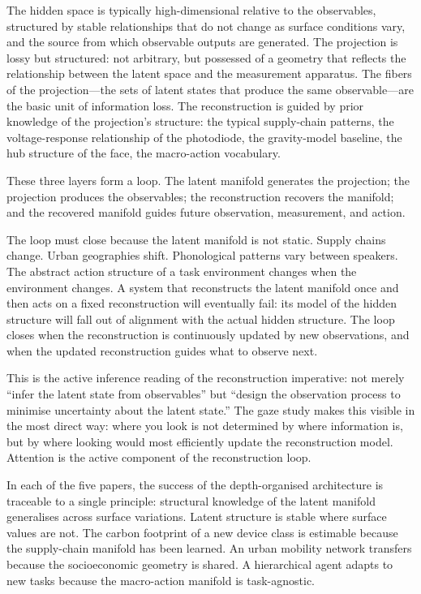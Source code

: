 \documentclass[12pt, letterpaper]{article}
\theoremstyle{remark}
\begin{document}
The hidden space is typically high-dimensional relative to the observables,
structured by stable relationships that do not change as surface conditions
vary, and the source from which observable outputs are generated.  The
projection is lossy but structured: not arbitrary, but possessed of a
geometry that reflects the relationship between the latent space and the
measurement apparatus.  The fibers of the projection---the sets of latent
states that produce the same observable---are the basic unit of information
loss.  The reconstruction is guided by prior knowledge of the projection's
structure: the typical supply-chain patterns, the voltage-response
relationship of the photodiode, the gravity-model baseline, the hub
structure of the face, the macro-action vocabulary.

These three layers form a loop.  The latent manifold generates the
projection; the projection produces the observables; the reconstruction
recovers the manifold; and the recovered manifold guides future observation,
measurement, and action.

The loop must close because the latent manifold is not static.  Supply
chains change.  Urban geographies shift.  Phonological patterns vary
between speakers.  The abstract action structure of a task environment
changes when the environment changes.  A system that reconstructs the
latent manifold once and then acts on a fixed reconstruction will eventually
fail: its model of the hidden structure will fall out of alignment with the
actual hidden structure.  The loop closes when the reconstruction is
continuously updated by new observations, and when the updated
reconstruction guides what to observe next.

This is the active inference reading of the reconstruction imperative:
not merely ``infer the latent state from observables'' but ``design the
observation process to minimise uncertainty about the latent state.''
The gaze study makes this visible in the most direct way: where you look
is not determined by where information is, but by where looking would most
efficiently update the reconstruction model.  Attention is the active
component of the reconstruction loop.

In each of the five papers, the success of the depth-organised architecture
is traceable to a single principle: structural knowledge of the latent
manifold generalises across surface variations.  Latent structure is stable
where surface values are not.  The carbon footprint of a new device class
is estimable because the supply-chain manifold has been learned.  An urban
mobility network transfers because the socioeconomic geometry is shared.
A hierarchical agent adapts to new tasks because the macro-action manifold
is task-agnostic.
\end{document}
